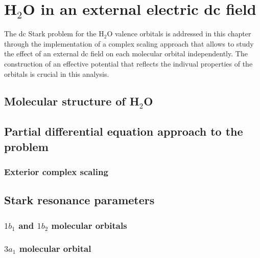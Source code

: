 \chapter{H$_{2}$O in an external electric dc field}
\label{cha:dc_h2o}

The dc Stark problem for the H$_{2}$O valence orbitals is addressed in
this chapter through the implementation of a complex scaling approach
that allows to study the effect of an external dc field on each
molecular orbital independently. The construction of an effective
potential that reflects the indivual properties of the orbitals is
crucial in this analysis.


\section{Molecular structure of H$_{2}$O}



\section{Partial differential equation approach to the problem}
\subsection{Exterior complex scaling}

\section{Stark resonance parameters}
\subsection{$1b_{1}$ and $1b_{2}$ molecular orbitals}
\subsection{$3a_{1}$ molecular orbital}

